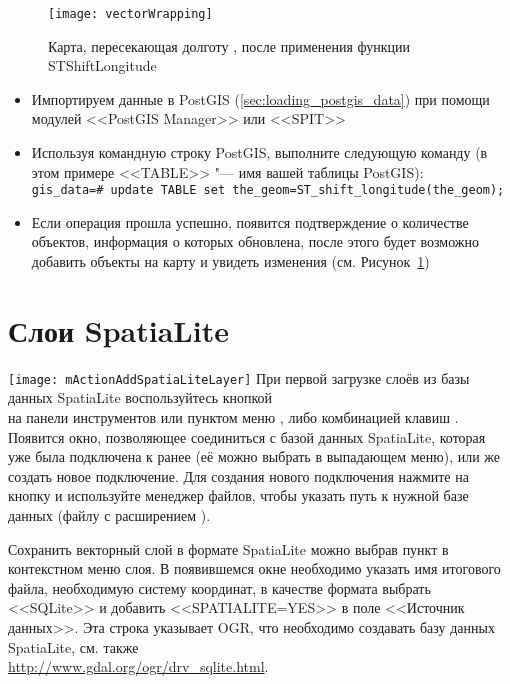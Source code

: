 \begin{figure}[ht]
   \centering
   \texttt{[image: vectorWrapping]}
   \caption{Карта, пересекающая долготу , после применения функции ST\textunderscore Shift\textunderscore Longitude \wincaption}
\label{fig:vector_wrapping}
\end{figure}


\begin{itemize}[label=--]
\item Импортируем данные в PostGIS (\ref{sec:loading_postgis_data}) при помощи
модулей <<PostGIS Manager>> или <<SPIT>>
\item Используя командную строку PostGIS, выполните следующую команду
(в этом примере <<TABLE>> "--- имя вашей таблицы PostGIS): \\
\texttt{gis\_data=\# update TABLE set the\_geom=ST\_shift\_longitude(the\_geom);}
\item Если операция прошла успешно, появится подтверждение о количестве
объектов, информация о которых обновлена, после этого будет возможно добавить
объекты на карту и увидеть изменения (см. Рисунок~\ref{fig:vector_wrapping})
\end{itemize}

\section{Слои SpatiaLite}
\label{label_spatialite}

\texttt{[image: mActionAddSpatiaLiteLayer]}
При первой загрузке слоёв из базы данных SpatiaLite воспользуйтесь кнопкой \\
на панели инструментов или пунктом
меню , либо комбинацией клавиш .
Появится окно, позволяющее соединиться с базой данных SpatiaLite,
которая уже была подключена к \qg ранее (её можно выбрать в выпадающем
меню), или же создать новое подключение. Для создания нового подключения
нажмите на кнопку  и используйте менеджер файлов, чтобы
указать путь к нужной базе данных (файлу с расширением ).

Сохранить векторный слой в формате SpatiaLite можно выбрав пункт 
в контекстном меню слоя. В появившемся окне необходимо указать имя итогового
файла, необходимую систему координат, в качестве формата выбрать <<SQLite>>
и добавить <<SPATIALITE=YES>> в поле <<Источник данных>>. Эта строка указывает
OGR, что необходимо создавать базу данных SpatiaLite, см. также \\
\url{http://www.gdal.org/ogr/drv_sqlite.html}.

